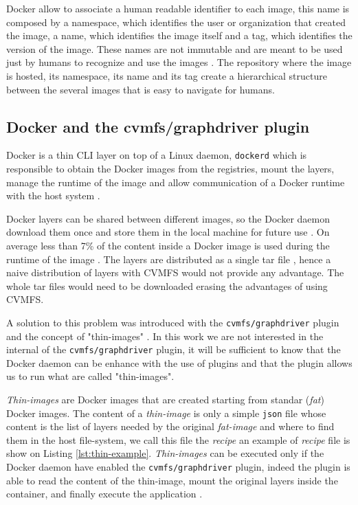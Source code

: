 Docker allow to associate a human readable identifier to each image, this name
is composed by a namespace, which identifies the user or organization that created
the image, a name, which identifies the image itself and a tag, which identifies
the version of the image. These names are not immutable and are meant to be
used just by humans to recognize and use the images \cite{docker:tag}.
The repository where the image is hosted, its namespace, its name and its tag
create a hierarchical structure between the several images that is easy to
navigate for humans.

\subsection{Docker and the cvmfs/graphdriver plugin}
\label{subsec:docker-thin-images}

Docker is a thin CLI layer on top of a Linux daemon, \texttt{dockerd} which is
responsible to obtain the Docker images from the registries, mount the layers,
manage the runtime of the image and allow communication of a Docker runtime
with the host system \cite{docker:overview}.

Docker layers can be shared between different images, so the Docker daemon
download them once and store them in the local machine for future use
\cite{docker:storage}. On average less than 7\% of the content inside a Docker
image is used during the runtime of the image \cite{slacker}. The layers are
distributed as a single tar file \cite{oci:image-filesystem}, hence a naive
distribution of layers with CVMFS would not provide any advantage. The whole
tar files would need to be downloaded erasing the advantages of using CVMFS.

A solution to this problem was introduced with the \texttt{cvmfs/graphdriver}
plugin and the concept of "thin-images" \cite{graphdriver-plugin}. In this work
we are not interested in the internal of the \texttt{cvmfs/graphdriver} plugin,
it will be sufficient to know that the Docker daemon can be enhance with the
use of plugins \cite{docker:plugin} and that the plugin allows us to run what
are called "thin-images".

\textit{Thin-images} are Docker images that are created starting from standar
(\textit{fat}) Docker images. The content of a \textit{thin-image} is only a
simple \texttt{json} file whose content is the list of layers needed by the
original \textit{fat-image} and where to find them in the host file-system, we
call this file the \textit{recipe} an example of \textit{recipe} file is show
on Listing \ref{lst:thin-example}. \textit{Thin-images} can be executed only if
the Docker daemon have enabled the \texttt{cvmfs/graphdriver} plugin, indeed
the plugin is able to read the content of the thin-image, mount the original
layers inside the container, and finally execute the application
\cite{graphdriver-plugin}.

